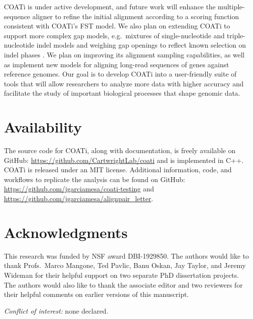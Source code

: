 \documentclass[12pt,letterpaper]{article}
\begin{document}
COATi is under active development, and future work will enhance the multiple-sequence aligner to refine the initial alignment according to a scoring function consistent with COATi's FST model. We also plan on extending COATi to support more complex gap models, e.g.\ mixtures of single-nucleotide and triple-nucleotide indel models and weighing gap openings to reflect known selection on indel phases \citep{zhu2022profiling}. We plan on improving its alignment sampling capabilities, as well as implement new models for aligning long-read sequences of genes against reference genomes. Our goal is to develop COATi into a user-friendly suite of tools that will allow researchers to analyze more data with higher accuracy and facilitate the study of important biological processes that shape genomic data.

\section*{Availability}

The source code for COATi, along with documentation, is freely available on GitHub: \url{https://github.com/CartwrightLab/coati} and is implemented in C++. COATi is released under an MIT license. Additional information, code, and workflows to replicate the analysis can be found on GitHub: \url{https://github.com/jgarciamesa/coati-testing} and \url{https://github.com/jgarciamesa/alignpair_letter}.


\section*{Acknowledgments}

This research was funded by NSF award DBI-1929850.
%
The authors would like to thank Profs.\ Marco Mangone, Ted Pavlic, Banu Oskan, Jay Taylor, and Jeremy Wideman for their helpful support on two separate PhD dissertation projects. The authors would also like to thank the associate editor and two reviewers for their helpful comments on earlier versions of this manuscript.

\noindent \textit{Conflict of interest:} none declared.

%
\setlength{\bibhang}{0pt}


\nolinenumbers
\end{document}
